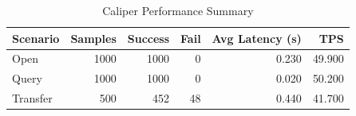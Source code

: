 \begin{table}
\caption{Caliper Performance Summary}
\label{tab:caliper_round}
\begin{tabular}{lrrrrr}
\toprule
Scenario & Samples & Success & Fail & Avg Latency (s) & TPS \\
\midrule
Open & 1000 & 1000 & 0 & 0.230 & 49.900 \\
Query & 1000 & 1000 & 0 & 0.020 & 50.200 \\
Transfer & 500 & 452 & 48 & 0.440 & 41.700 \\
\bottomrule
\end{tabular}
\end{table}
